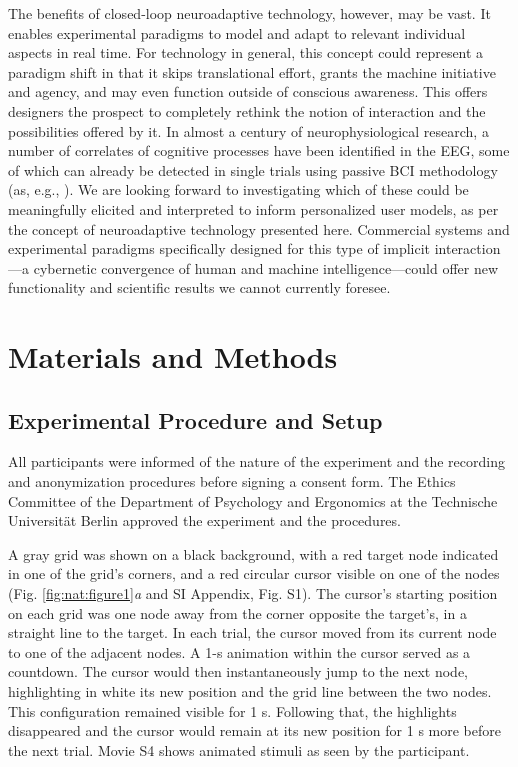 The benefits of closed-loop neuroadaptive technology, however, may be vast. It enables experimental paradigms to model and adapt to relevant individual aspects in real time. For technology in general, this concept could represent a paradigm shift in that it skips translational effort, grants the machine initiative and agency, and may even function outside of conscious awareness. This offers designers the prospect to completely rethink the notion of interaction and the possibilities offered by it. In almost a century of neurophysiological research, a number of correlates of cognitive processes have been identified in the EEG, some of which can already be detected in single trials using passive BCI methodology (as, e.g., ). We are looking forward to investigating which of these could be meaningfully elicited and interpreted to inform personalized user models, as per the concept of neuroadaptive technology presented here. Commercial systems and experimental paradigms specifically designed for this type of implicit interaction---a cybernetic convergence of human and machine intelligence---could offer new functionality and scientific results we cannot currently foresee.


\section{Materials and Methods}

\subsection{Experimental Procedure and Setup}

All participants were informed of the nature of the experiment and the recording and anonymization procedures before signing a consent form. The Ethics Committee of the Department of Psychology and Ergonomics at the Technische Universität Berlin approved the experiment and the procedures.

A gray grid was shown on a black background, with a red target node indicated in one of the grid's corners, and a red circular cursor visible on one of the nodes (Fig. \ref{fig:nat:figure1}\emph{a} and SI Appendix, Fig. S1). The cursor's starting position on each grid was one node away from the corner opposite the target's, in a straight line to the target. In each trial, the cursor moved from its current node to one of the adjacent nodes. A 1-s animation within the cursor served as a countdown. The cursor would then instantaneously jump to the next node, highlighting in white its new position and the grid line between the two nodes. This configuration remained visible for 1 s. Following that, the highlights disappeared and the cursor would remain at its new position for 1 s more before the next trial. Movie S4 shows animated stimuli as seen by the participant.

